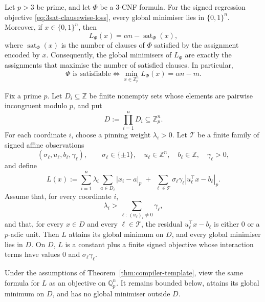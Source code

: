 
\begin{thm}\label{thm:3sat-clausewise}
Let $p>3$ be prime, and let $\Phi$ be a $3$-CNF formula. For the signed
regression objective \eqref{eq:3sat-clausewise-loss}, every global minimiser
lies in $\{0,1\}^n$. Moreover, if $x\in\{0,1\}^n$, then
\[
L_\Phi(x)=\alpha n-\operatorname{sat}_\Phi(x),
\]
where $\operatorname{sat}_\Phi(x)$ is the number of clauses of $\Phi$
satisfied by the assignment encoded by $x$. Consequently, the global
minimisers of $L_\Phi$ are exactly the assignments that maximise the number of
satisfied clauses. In particular,
\[
\Phi\text{ is satisfiable}
\iff
\min_{x\in\mathbb Z_p^n}L_\Phi(x)=\alpha n-m.
\]
\end{thm}

\begin{thm}
\label{thm:compiler-template}
Fix a prime \(p\). Let \(D_i\subseteq\mathbb Z\) be finite nonempty sets whose elements are pairwise incongruent modulo \(p\), and put
\[
D:=\prod_{i=1}^n D_i\subseteq\mathbb Z_p^n.
\]
For each coordinate \(i\), choose a pinning weight \(\lambda_i>0\). Let \(\mathcal T\) be a finite family of signed affine observations
\[
(\sigma_\ell,u_\ell,b_\ell,\gamma_\ell),
\qquad
\sigma_\ell\in\{\pm1\},\quad u_\ell\in\mathbb Z^n,\quad b_\ell\in\mathbb Z,\quad \gamma_\ell>0,
\]
and define
\[
L(x):=
\sum_{i=1}^n\lambda_i\sum_{a\in D_i}|x_i-a|_p
\;+\;
\sum_{\ell\in\mathcal T}\sigma_\ell\gamma_\ell |u_\ell^\top x-b_\ell|_p.
\]
Assume that, for every coordinate \(i\),
\[
\lambda_i>\sum_{\ell:\,(u_\ell)_i\neq 0}\gamma_\ell,
\]
and that, for every \(x\in D\) and every \(\ell\in\mathcal T\), the residual \(u_\ell^\top x-b_\ell\) is either \(0\) or a \(p\)-adic unit. Then \(L\) attains its global minimum on \(D\), and every global minimiser lies in \(D\). On \(D\), \(L\) is a constant plus a finite signed objective whose interaction terms have values \(0\) and \(\sigma_\ell\gamma_\ell\).
\end{thm}

\begin{corollary}
\label{cor:qp-extension}
Under the assumptions of Theorem~\ref{thm:compiler-template}, view the same formula for \(L\) as an objective on \(\mathbb Q_p^n\). It remains bounded below, attains its global minimum on \(D\), and has no global minimiser outside \(D\).
\end{corollary}

